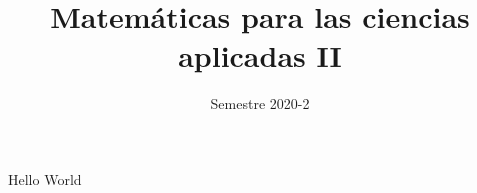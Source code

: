 \documentclass{article}
\title{Matemáticas para las ciencias aplicadas II}
\date{Semestre 2020-2}
\begin{document}
	\maketitle
	
	\centering Hello World
	
	
	
\end{document}
